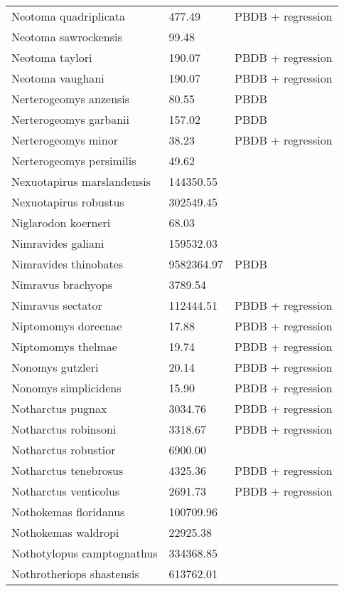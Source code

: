 \documentclass{article}
\begin{document}
\begin{center}
\begin{longtable}{p{} p{} p{} }
  Neotoma quadriplicata & 477.49 & PBDB + regression \\ 
  Neotoma sawrockensis & 99.48 & \cite{Tomiya2013} \\ 
  Neotoma taylori & 190.07 & PBDB + regression \\ 
  Neotoma vaughani & 190.07 & PBDB + regression \\ 
  Nerterogeomys anzensis & 80.55 & PBDB \\ 
  Nerterogeomys garbanii & 157.02 & PBDB \\ 
  Nerterogeomys minor & 38.23 & PBDB + regression \\ 
  Nerterogeomys persimilis & 49.62 & \cite{Grohe2010} \\ 
  Nexuotapirus marslandensis & 144350.55 & \cite{Tomiya2013} \\ 
  Nexuotapirus robustus & 302549.45 & \cite{Tomiya2013} \\ 
  Niglarodon koerneri & 68.03 & \cite{Tomiya2013} \\ 
  Nimravides galiani & 159532.03 & \cite{Tomiya2013} \\ 
  Nimravides thinobates & 9582364.97 & PBDB \\ 
  Nimravus brachyops & 3789.54 & \cite{Tomiya2013} \\ 
  Nimravus sectator & 112444.51 & PBDB + regression \\ 
  Niptomomys doreenae & 17.88 & PBDB + regression \\ 
  Niptomomys thelmae & 19.74 & PBDB + regression \\ 
  Nonomys gutzleri & 20.14 & PBDB + regression \\ 
  Nonomys simplicidens & 15.90 & PBDB + regression \\ 
  Notharctus pugnax & 3034.76 & PBDB + regression \\ 
  Notharctus robinsoni & 3318.67 & PBDB + regression \\ 
  Notharctus robustior & 6900.00 & \cite{Soligo2006} \\ 
  Notharctus tenebrosus & 4325.36 & PBDB + regression \\ 
  Notharctus venticolus & 2691.73 & PBDB + regression \\ 
  Nothokemas floridanus & 100709.96 & \cite{Tomiya2013} \\ 
  Nothokemas waldropi & 22925.38 & \cite{Tomiya2013} \\ 
  Nothotylopus camptognathus & 334368.85 & \cite{Tomiya2013} \\ 
  Nothrotheriops shastensis & 613762.01 & \cite{Brook2004a} \\ 

\end{longtable}
\end{center}
\end{document}
